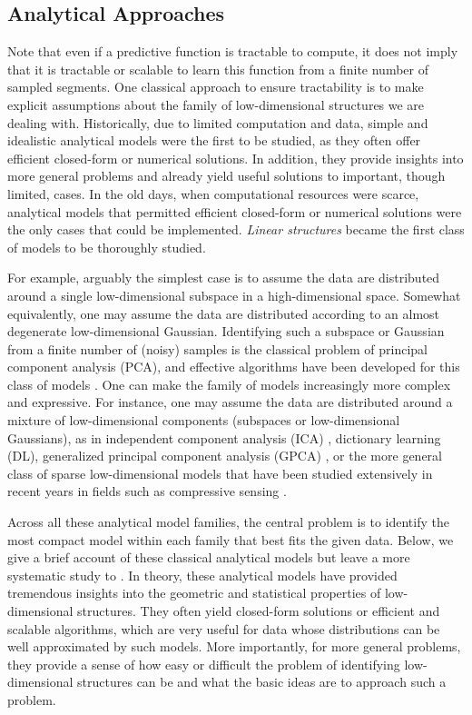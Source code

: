 \documentclass[../../book-main.tex]{subfiles}
\begin{document}
\subsection{Analytical Approaches}
\label{sec:analytical}
Note that even if a predictive function is tractable to compute, it does not imply that it is tractable or scalable to learn this function from a finite number of sampled segments. One classical approach to ensure tractability is to make explicit assumptions about the family of low-dimensional structures we are dealing with. Historically, due to limited computation and data, simple and idealistic analytical models were the first to be studied, as they often offer efficient closed-form or numerical solutions. In addition, they provide insights into more general problems and already yield useful solutions to important, though limited, cases. In the old days, when computational resources were scarce, analytical models that permitted efficient closed-form or numerical solutions were the only cases that could be implemented. \textit{Linear structures} became the first class of models to be thoroughly studied.

For example, arguably the simplest case is to assume the data are distributed around a single low-dimensional subspace in a high-dimensional space. Somewhat equivalently, one may assume the data are distributed according to an almost degenerate low-dimensional Gaussian. Identifying such a subspace or Gaussian from a finite number of (noisy) samples is the classical problem of principal component analysis (PCA), and effective algorithms have been developed for this class of models \cite{JolliffeI2002}. One can make the family of models increasingly more complex and expressive. For instance, one may assume the data are distributed around a mixture of low-dimensional components (subspaces or low-dimensional Gaussians), as in independent component analysis (ICA) \cite{Ans-1985}, dictionary learning (DL), generalized principal component analysis (GPCA) \cite{Vidal-GPCA}, or the more general class of sparse low-dimensional models that have been studied extensively in recent years in fields such as compressive sensing \cite{Wright-Ma-2022}.

Across all these analytical model families, the central problem is to identify the most compact model within each family that best fits the given data. Below, we give a brief account of these classical analytical models but leave a more systematic study to . In theory, these analytical models have provided tremendous insights into the geometric and statistical properties of low-dimensional structures. They often yield closed-form solutions or efficient and scalable algorithms, which are very useful for data whose distributions can be well approximated by such models. More importantly, for more general problems, they provide a sense of how easy or difficult the problem of identifying low-dimensional structures can be and what the basic ideas are to approach such a problem.
\end{document}
